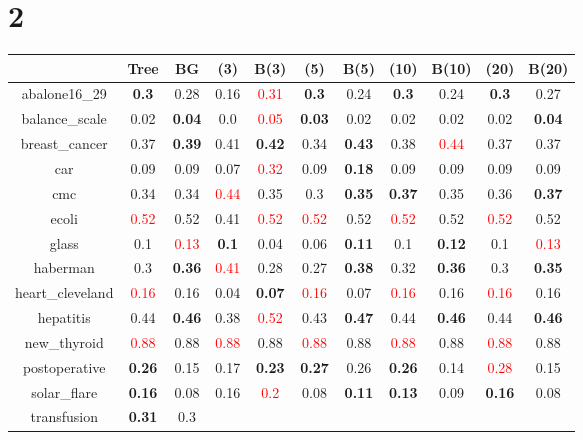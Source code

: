 \documentclass{article}%
\begin{document}
\section*{2}%
\begin{tabular}{c|cccccccccc}%
\hline%
&Tree&BG&(3)&B(3)&(5)&B(5)&(10)&B(10)&(20)&B(20)\\%
\hline%
abalone16\_29&\textbf{0.3}&0.28&0.16&\textcolor{red}{ 
0.31
}&\textbf{0.3}&0.24&\textbf{0.3}&0.24&\textbf{0.3}&0.27\\%
\hline%
balance\_scale&0.02&\textbf{0.04}&0.0&\textcolor{red}{ 
0.05
}&\textbf{0.03}&0.02&0.02&0.02&0.02&\textbf{0.04}\\%
\hline%
breast\_cancer&0.37&\textbf{0.39}&0.41&\textbf{0.42}&0.34&\textbf{0.43}&0.38&\textcolor{red}{ 
0.44
}&0.37&0.37\\%
\hline%
car&0.09&0.09&0.07&\textcolor{red}{ 
0.32
}&0.09&\textbf{0.18}&0.09&0.09&0.09&0.09\\%
\hline%
cmc&0.34&0.34&\textcolor{red}{ 
0.44
}&0.35&0.3&\textbf{0.35}&\textbf{0.37}&0.35&0.36&\textbf{0.37}\\%
\hline%
ecoli&\textcolor{red}{ 
0.52
}&0.52&0.41&\textcolor{red}{ 
0.52
}&\textcolor{red}{ 
0.52
}&0.52&\textcolor{red}{ 
0.52
}&0.52&\textcolor{red}{ 
0.52
}&0.52\\%
\hline%
glass&0.1&\textcolor{red}{ 
0.13
}&\textbf{0.1}&0.04&0.06&\textbf{0.11}&0.1&\textbf{0.12}&0.1&\textcolor{red}{ 
0.13
}\\%
\hline%
haberman&0.3&\textbf{0.36}&\textcolor{red}{ 
0.41
}&0.28&0.27&\textbf{0.38}&0.32&\textbf{0.36}&0.3&\textbf{0.35}\\%
\hline%
heart\_cleveland&\textcolor{red}{ 
0.16
}&0.16&0.04&\textbf{0.07}&\textcolor{red}{ 
0.16
}&0.07&\textcolor{red}{ 
0.16
}&0.16&\textcolor{red}{ 
0.16
}&0.16\\%
\hline%
hepatitis&0.44&\textbf{0.46}&0.38&\textcolor{red}{ 
0.52
}&0.43&\textbf{0.47}&0.44&\textbf{0.46}&0.44&\textbf{0.46}\\%
\hline%
new\_thyroid&\textcolor{red}{ 
0.88
}&0.88&\textcolor{red}{ 
0.88
}&0.88&\textcolor{red}{ 
0.88
}&0.88&\textcolor{red}{ 
0.88
}&0.88&\textcolor{red}{ 
0.88
}&0.88\\%
\hline%
postoperative&\textbf{0.26}&0.15&0.17&\textbf{0.23}&\textbf{0.27}&0.26&\textbf{0.26}&0.14&\textcolor{red}{ 
0.28
}&0.15\\%
\hline%
solar\_flare&\textbf{0.16}&0.08&0.16&\textcolor{red}{ 
0.2
}&0.08&\textbf{0.11}&\textbf{0.13}&0.09&\textbf{0.16}&0.08\\%
\hline%
transfusion&\textbf{0.31}&0.3&\textcolor{red}{ 
}
\end{tabular}
\end{document}
